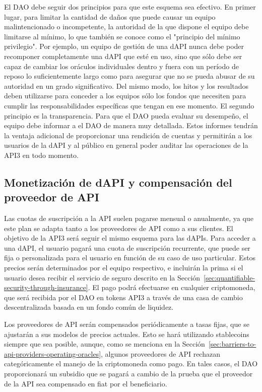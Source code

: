 \documentclass[11pt]{article}
\begin{document}
El DAO debe seguir dos principios para que este esquema sea efectivo. En primer lugar, para limitar la cantidad de daños que puede causar un equipo malintencionado o incompetente, la autoridad de la que dispone el equipo debe limitarse al mínimo, lo que también se conoce como el "principio del mínimo privilegio". Por ejemplo, un equipo de gestión de una dAPI nunca debe poder recomponer completamente una dAPI que esté en uso, sino que sólo debe ser capaz de cambiar los oráculos individuales dentro y fuera con un período de reposo lo suficientemente largo como para asegurar que no se pueda abusar de su autoridad en un grado significativo. Del mismo modo, los hitos y los resultados deben utilizarse para conceder a los equipos sólo los fondos que necesiten para cumplir las responsabilidades específicas que tengan en ese momento. El segundo principio es la transparencia. Para que el DAO pueda evaluar su desempeño, el equipo debe informar a el DAO de manera muy detallada. Estos informes tendrán la ventaja adicional de proporcionar una rendición de cuentas y permitirán a los usuarios de la dAPI y al público en general poder auditar las operaciones de la API3 en todo momento. 

\subsection{Monetización de dAPI y compensación del proveedor de API}
\label{sec:dapi-monetization-and-api-provider-compensation}

Las cuotas de suscripción a la API suelen pagarse mensual o anualmente, ya que este plan se adapta tanto a los proveedores de API como a sus clientes. El objetivo de la API3 será seguir el mismo esquema para las dAPIs. Para acceder a una dAPI, el usuario pagará una cuota de suscripción recurrente, que puede ser fija o personalizada para el usuario en función de su caso de uso particular. Estos precios serán determinados por el equipo respectivo, e incluirán la prima si el usuario desea recibir el servicio de seguro descrito en la Sección~\ref{sec:quantifiable-security-through-insurance}.
El pago podrá efectuarse en cualquier criptomoneda, que será recibida por el DAO en tokens API3 a través de una casa de cambio descentralizada basada en un fondo común de liquidez.

Los proveedores de API serán compensados periódicamente a tasas fijas, que se ajustarán a sus modelos de precios actuales. Esto se hará utilizando stablecoins siempre que sea posible, aunque, como se menciona en la Sección~\ref{sec:barriers-to-api-providers-operating-oracles}, algunos proveedores de API rechazan categóricamente el manejo de la criptomoneda como pago. En tales casos, el DAO proporcionará un subsidio que se pagará a cambio de la prueba que el proveedor de la API sea compensado en fiat por el beneficiario.
\end{document}

